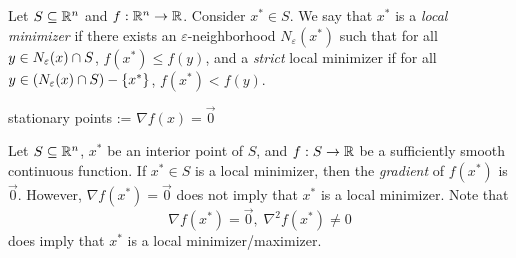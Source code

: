 \begin{defn}
    Let $S \subseteq \mathbb{R}^n$ and $f: \mathbb{R}^n \to \mathbb{R}$. Consider $x^* \in S$. We say that $x^*$ is a \emph{local minimizer} if there exists an $\varepsilon$-neighborhood $N_{\varepsilon}(x^*)$ such that for all $y \in N_{\varepsilon}(x) \cap S$, $f(x^*) \leq f(y)$, and a \emph{strict} local minimizer if for all $y \in \left(N_{\varepsilon}(x) \cap S\right) - \{x^*\}$, $f(x^*) < f(y)$.
\end{defn}

stationary points := $\nabla f(x) = \vec{0}$

\begin{rmk}
    Let $S \subseteq \mathbb{R}^n$, $x^*$ be an interior point of $S$, and $f: S \to \mathbb{R}$ be a sufficiently smooth continuous function. If $x^* \in S$ is a local minimizer, then the \emph{gradient} of $f(x^*)$ is $\vec{0}$. However, $\nabla f(x^*) = \vec{0}$ does not imply that $x^*$ is a local minimizer. Note that
    \[\nabla f(x^*) = \vec{0},\;\nabla^2 f(x^*) \neq 0\] does imply that $x^*$ is a local minimizer/maximizer.
\end{rmk}

